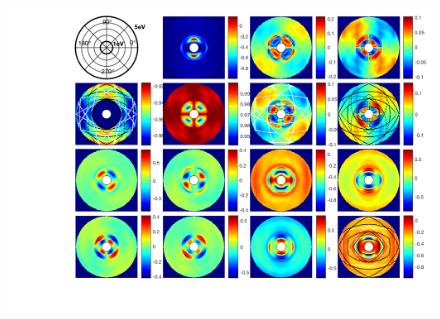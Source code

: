 
\begin{figure}  %
    \centering
    \includegraphics[width=\linewidth, trim=3cm 1cm 0.4cm 0cm, clip]{figures/ch4/S5B/contour/Muller_rot_S5B_COMSOLSIM_55_final(2).pdf}

\end{figure}

